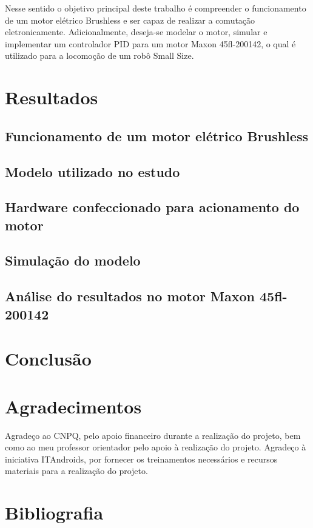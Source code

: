 \documentclass[a4paper,11pt]{article}
\begin{document}
		Nesse sentido o objetivo principal deste trabalho é compreender o funcionamento de um motor elétrico Brushless e ser capaz de realizar a comutação eletronicamente. Adicionalmente, deseja-se modelar o motor, simular e implementar um controlador PID para um motor Maxon 45fl-200142, o qual é utilizado para a locomoção de um robô Small Size.
	
	\section{Resultados}
		\subsection{Funcionamento de um motor elétrico Brushless}
		
		\subsection{Modelo utilizado no estudo}
		
		\subsection{Hardware confeccionado para acionamento do motor}
		
		\subsection{Simulação do modelo}
		
		\subsection{Análise do resultados no motor Maxon 45fl-200142}
	\section{Conclusão}
	
	\section{Agradecimentos}
	Agradeço ao CNPQ, pelo apoio financeiro durante a realização do projeto, bem como ao meu professor orientador pelo apoio à realização do projeto. Agradeço à iniciativa ITAndroids, por fornecer os treinamentos necessários e recursos materiais para a realização do projeto.
	
	\section{Bibliografia}
	\printbibliography[heading=none]
	
\end{document}

